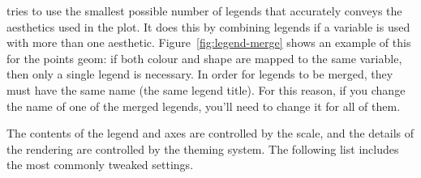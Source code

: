 % 


\ggplot tries to use the smallest possible number of legends that accurately conveys the aesthetics used in the plot.  It does this by combining legends if a variable is used with more than one aesthetic.  Figure~\ref{fig:legend-merge} shows an example of this for the points geom: if both colour and shape are mapped to the same variable, then only a single legend is necessary.  In order for legends to be merged, they must have the same name (the same legend title).  For this reason, if you change the name of one of the merged legends, you'll need to change it for all of them.

% 


The contents of the legend and axes are controlled by the scale, and the details of the rendering are controlled by the theming system. The following list includes the most commonly tweaked settings.

